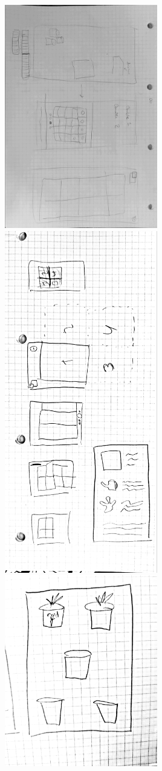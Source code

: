 \includegraphics[width=0.5\textwidth]{img/s1-1.jpg}\\
\includegraphics[width=0.5\textwidth]{img/s1-3.jpg}\\
\includegraphics[width=0.5\textwidth]{img/s1-5.jpg}\\
